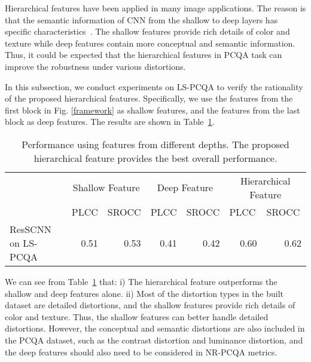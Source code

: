 \documentclass[acmsmall]{acmart}
\begin{document}
\par Hierarchical features have been applied in many image applications. The reason is that the semantic information of CNN from the shallow to deep layers has specific characteristics~\cite{Bai2020MFT}. The shallow features provide rich details of color and texture while deep features contain more conceptual and semantic information. Thus, it could be expected that the hierarchical features in PCQA task can improve the robustness under various distortions.
\par In this subsection, we conduct experiments on LS-PCQA to verify the rationality of the proposed hierarchical features. Specifically, we use the features from the first block in Fig. \ref{framework} as shallow features, and the features from the last block as deep features. The results are shown in Table~\ref{ShallowAndDeep}.


\begin{table}[htbp]
  \centering
  \caption{Performance using features from different depths. The proposed hierarchical feature provides the best overall performance.}
  \begin{footnotesize}
    \begin{tabular}{l|rr|rr|rr}
    \hline
    \multirow{2}[4]{*}{} & \multicolumn{2}{c|}{Shallow Feature} & \multicolumn{2}{c|}{Deep Feature} & \multicolumn{2}{c}{Hierarchical Feature} \\
\cline{2-7}          & \multicolumn{1}{l}{PLCC} & \multicolumn{1}{l|}{SROCC} & \multicolumn{1}{l}{PLCC} & \multicolumn{1}{l|}{SROCC} & \multicolumn{1}{l}{PLCC} & \multicolumn{1}{l}{\hfill SROCC} \\
    \hline
    ResSCNN on LS-PCQA &0.51&0.53&0.41&0.42&0.60&0.62  \\
    \hline
    \end{tabular}\end{footnotesize}
  \label{ShallowAndDeep}\end{table}



\par We can see from Table~\ref{ShallowAndDeep} that: i) The hierarchical feature outperforms the shallow and deep features alone. ii) Most of the distortion types in the built dataset are detailed distortions, and the shallow features provide rich details of color and texture. Thus, the shallow features can better handle detailed distortions. However, the conceptual and semantic distortions are also included in the PCQA dataset, such as the contrast distortion and luminance distortion, and the deep features should also need to be considered in NR-PCQA metrics.
\end{document}
